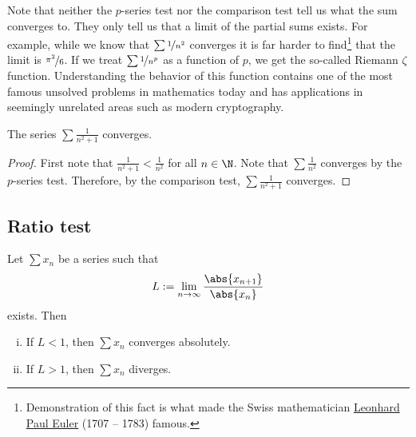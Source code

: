 \documentclass[12pt]{book}
\begin{document}
Note that neither the $p$-series test nor the comparison test 
tell us what the sum converges to.
They only tell us that a limit
of the partial sums exists.
For example, while we know that
$\sum \nicefrac{1}{n^2}$ converges it is far harder to
find\footnote{Demonstration of this fact is
what made the Swiss mathematician
\href{http://en.wikipedia.org/wiki/Leonhard_Euler}{Leonhard Paul Euler} (1707 -- 1783)
famous.}
that the limit is $\nicefrac{\pi^2}{6}$.
If we treat $\sum \nicefrac{1}{n^p}$ as a function of $p$,
we get the so-called Riemann $\zeta$ function.
Understanding the
behavior of this function contains
one of the most famous unsolved problems in mathematics today and has applications
in seemingly unrelated areas such as modern cryptography.

\begin{example}
The series $\sum \frac{1}{n^2+1}$ converges.

\begin{proof}  First note that $\frac{1}{n^2+1} < \frac{1}{n^2}$ for all $n \in \N$.
Note that $\sum \frac{1}{n^2}$ converges by the $p$-series test.
Therefore, by the comparison test, $\sum \frac{1}{n^2+1}$ converges.
\end{proof}
\end{example}

\subsection*{Ratio test}

\begin{prop}
Let $\sum x_n$ be a series such that
\begin{equation*}
L := \lim_{n\to\infty} \frac{\abs{x_{n+1}}}{\abs{x_n}}
\end{equation*}
exists.
Then
\begin{enumerate}[(i)]
\item
If $L < 1$, then $\sum x_n$ converges absolutely.
\item
If $L > 1$, then $\sum x_n$ diverges.
\end{enumerate}
\end{prop}
\end{document}
